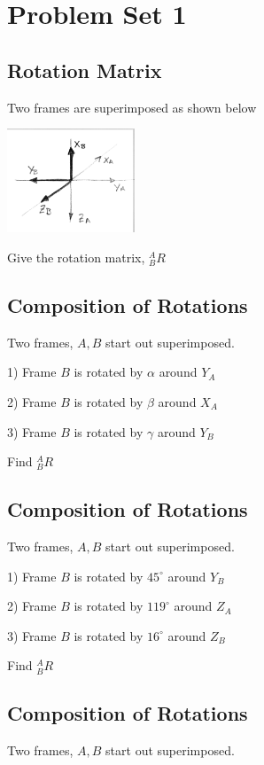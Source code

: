 \documentclass{article}
\begin{document}
\section{Problem Set 1}

\subsection{Rotation Matrix}
Two frames are superimposed as shown below

\includegraphics[width=1.5in]{hw1p1_w18.png}

Give the rotation matrix, $^A_BR$


\subsection{Composition of Rotations}
Two frames, $A, B$ start out superimposed.

1) Frame $B$ is rotated by $\alpha$ around $Y_A$


2) Frame $B$ is rotated by $\beta$ around $X_A$


3) Frame $B$ is rotated by $\gamma$ around $Y_B$

Find $^A_BR$


\subsection{Composition of Rotations}
Two frames, $A, B$ start out superimposed.

1) Frame $B$ is rotated by $45^\circ$ around $Y_B$


2) Frame $B$ is rotated by $119^\circ$ around $Z_A$


3) Frame $B$ is rotated by $16^\circ$ around $Z_B$

Find $^A_BR$
 



\subsection{Composition of Rotations}
Two frames, $A, B$ start out superimposed.
\end{document}
